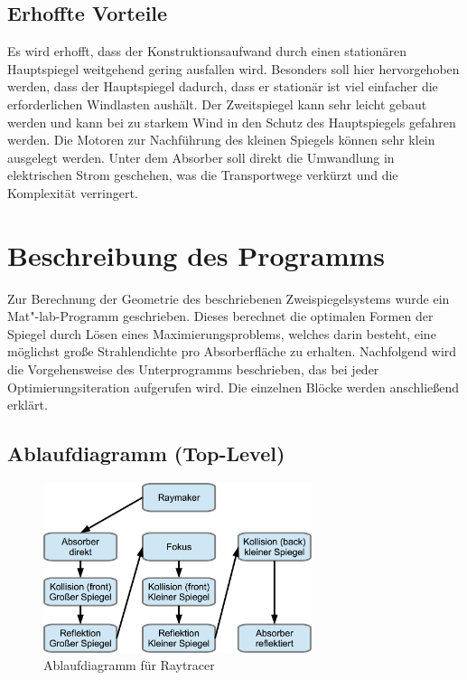 \documentclass[fontsize=10pt,paper=a4,bibliography=totoc]{scrartcl}
\begin{document}
\subsection{Erhoffte Vorteile}
Es wird erhofft, dass der Konstruktionsaufwand durch einen stationären Hauptspiegel weitgehend gering ausfallen wird. Besonders soll hier hervorgehoben werden, dass der Hauptspiegel dadurch, dass er stationär ist viel einfacher die erforderlichen Windlasten aushält. Der Zweitspiegel kann sehr leicht gebaut werden und kann bei zu starkem Wind in den Schutz des Hauptspiegels gefahren werden. Die Motoren zur Nachführung des kleinen Spiegels können sehr klein ausgelegt werden. Unter dem Absorber soll direkt die Umwandlung in elektrischen Strom geschehen, was die Transportwege verkürzt und die Komplexität verringert. 

\section{Beschreibung des Programms}
Zur Berechnung der Geometrie des beschriebenen Zweispiegelsystems wurde ein Mat"-lab-Programm geschrieben. Dieses berechnet die optimalen Formen der Spiegel durch Lösen eines Maximierungsproblems, welches darin besteht, eine möglichst große Strahlendichte pro Absorberfläche zu erhalten. Nachfolgend wird die Vorgehensweise des Unterprogramms beschrieben, das bei jeder Optimierungsiteration aufgerufen wird. Die einzelnen Blöcke werden anschließend erklärt.
\subsection{Ablaufdiagramm (Top-Level)}
\begin{figure}[htb]
	\centering
	\includegraphics[width=0.7\textwidth]{images/Diagramm.png}
	\caption{Ablaufdiagramm für Raytracer}
	\label{pic:Raytracer}
\end{figure}
\end{document}
